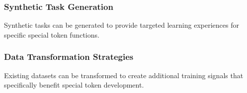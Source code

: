 \subsubsection{Synthetic Task Generation}

Synthetic tasks can be generated to provide targeted learning experiences for specific special token functions.

\subsubsection{Data Transformation Strategies}

Existing datasets can be transformed to create additional training signals that specifically benefit special token development.